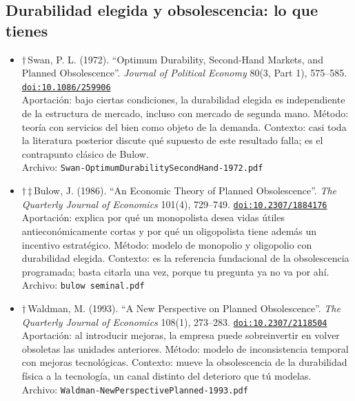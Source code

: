 \documentclass[11pt]{article}
\begin{document}
\subsection*{Durabilidad elegida y obsolescencia: lo que tienes}
\begin{itemize}
\item $\dagger$\,Swan, P. L. (1972). ``Optimum Durability, Second-Hand Markets, and Planned Obsolescence''. \textit{Journal of Political Economy} 80(3, Part 1), 575--585. \href{https://doi.org/10.1086/259906}{\texttt{doi:10.1086/259906}}\\
Aportación: bajo ciertas condiciones, la durabilidad elegida es independiente de la estructura de mercado, incluso con mercado de segunda mano. Método: teoría con servicios del bien como objeto de la demanda. Contexto: casi toda la literatura posterior discute qué supuesto de este resultado falla; es el contrapunto clásico de Bulow.\\
{\footnotesize Archivo: \texttt{Swan-OptimumDurabilitySecondHand-1972.pdf}}
\item $\dagger$\,$\ddagger$\,Bulow, J. (1986). ``An Economic Theory of Planned Obsolescence''. \textit{The Quarterly Journal of Economics} 101(4), 729--749. \href{https://doi.org/10.2307/1884176}{\texttt{doi:10.2307/1884176}}\\
Aportación: explica por qué un monopolista desea vidas útiles antieconómicamente cortas y por qué un oligopolista tiene además un incentivo estratégico. Método: modelo de monopolio y oligopolio con durabilidad elegida. Contexto: es la referencia fundacional de la obsolescencia programada; basta citarla una vez, porque tu pregunta ya no va por ahí.\\
{\footnotesize Archivo: \texttt{bulow seminal.pdf}}
\item $\dagger$\,Waldman, M. (1993). ``A New Perspective on Planned Obsolescence''. \textit{The Quarterly Journal of Economics} 108(1), 273--283. \href{https://doi.org/10.2307/2118504}{\texttt{doi:10.2307/2118504}}\\
Aportación: al introducir mejoras, la empresa puede sobreinvertir en volver obsoletas las unidades anteriores. Método: modelo de inconsistencia temporal con mejoras tecnológicas. Contexto: mueve la obsolescencia de la durabilidad física a la tecnología, un canal distinto del deterioro que tú modelas.\\
{\footnotesize Archivo: \texttt{Waldman-NewPerspectivePlanned-1993.pdf}}

\end{itemize}
\end{document}

